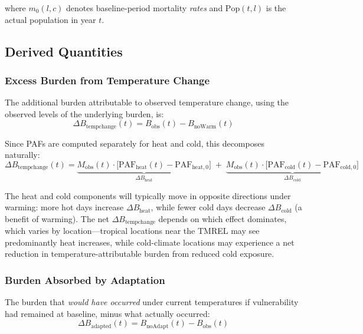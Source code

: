 \documentclass[11pt,a4paper]{article}
\begin{document}
where $m_0(l,c)$ denotes baseline-period mortality \emph{rates} and $\text{Pop}(t,l)$ is the actual population in year $t$.

\subsection{Derived Quantities}

\subsubsection{Excess Burden from Temperature Change}
The additional burden attributable to observed temperature change, using the observed levels of the underlying burden, is:
\begin{equation}
  \Delta B_{\text{tempchange}}(t) = B_{\text{obs}}(t) - B_{\text{noWarm}}(t)
  \label{eq:excess}
\end{equation}

Since PAFs are computed separately for heat and cold, this decomposes naturally:
\begin{equation}
  \Delta B_{\text{tempchange}}(t) = \underbrace{M_{\text{obs}}(t) \cdot \bigl[\text{PAF}_{\text{heat}}(t) - \text{PAF}_{\text{heat},0}\bigr]}_{\Delta B_{\text{heat}}} \;+\; \underbrace{M_{\text{obs}}(t) \cdot \bigl[\text{PAF}_{\text{cold}}(t) - \text{PAF}_{\text{cold},0}\bigr]}_{\Delta B_{\text{cold}}}
  \label{eq:excess_split}
\end{equation}

The heat and cold components will typically move in opposite directions under warming: more hot days increase $\Delta B_{\text{heat}}$, while fewer cold days decrease $\Delta B_{\text{cold}}$ (a benefit of warming). The net $\Delta B_{\text{tempchange}}$ depends on which effect dominates, which varies by location---tropical locations near the TMREL may see predominantly heat increases, while cold-climate locations may experience a net reduction in temperature-attributable burden from reduced cold exposure.

\subsubsection{Burden Absorbed by Adaptation}

The burden that \emph{would have occurred} under current temperatures if vulnerability had remained at baseline, minus what actually occurred:
\begin{equation}
  \Delta B_{\text{adapted}}(t) = B_{\text{noAdapt}}(t) - B_{\text{obs}}(t)
  \label{eq:adapted}
\end{equation}
\end{document}
